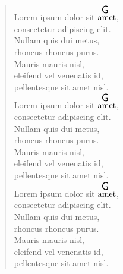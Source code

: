 \documentclass[twocolumn]{article}
\begin{document}
\begin{verse}
Lorem ipsum dolor sit $\overset{ \resizebox{0.3cm}{!}{\textsf{G}} }{\text{amet}}$, \\
consectetur adipiscing elit.\\
Nullam quis dui metus, \\
rhoncus rhoncus purus. \\
Mauris mauris nisl, \\
eleifend vel venenatis id, \\
pellentesque sit amet nisl.\\

Lorem ipsum dolor sit $\overset{ \resizebox{0.3cm}{!}{\textsf{G}} }{\text{amet}}$, \\
consectetur adipiscing elit.\\
Nullam quis dui metus, \\
rhoncus rhoncus purus. \\
Mauris mauris nisl, \\
eleifend vel venenatis id, \\
pellentesque sit amet nisl.\\

Lorem ipsum dolor sit $\overset{ \resizebox{0.3cm}{!}{\textsf{G}} }{\text{amet}}$, \\
consectetur adipiscing elit.\\
Nullam quis dui metus, \\
rhoncus rhoncus purus. \\
Mauris mauris nisl, \\
eleifend vel venenatis id, \\
pellentesque sit amet nisl.\\

\end{verse}
\end{document}
